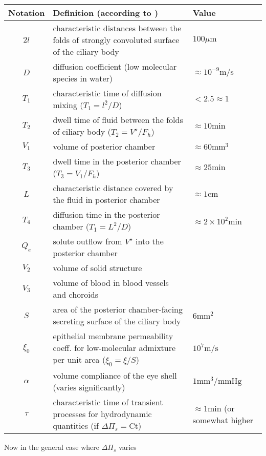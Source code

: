 \documentclass[11pt]{article}
\begin{document}
\begin{center}
\begin{tabular}{|c|p{}|l|}
\hline
Notation & Definition (according to \cite{lyubimov2007dynamics}) & Value \\
\hline
\hline
$2l$& characteristic distances between the folds of strongly convoluted surface of the ciliary body & $100 \mu \mathrm{m}$\\
\hline
$D$ & diffusion coefficient (low molecular species in water) & $\approx 10^{-9} \mathrm{m}/\mathrm{s}$\\
\hline
$T_1$ & characteristic time of diffusion mixing ($T_1 = l^2/D$)& $<2.5 \approx1$\\
\hline
$T_2$ & dwell time of fluid between the folds of ciliary body ($T_2 = V^\star /F_h$) & $\approx 10 \mathrm{min}$\\
\hline
$V_1$ & volume of posterior chamber & $\approx 60 \mathrm{mm}^3$\\
\hline
$T_3$ & dwell time in the posterior chamber ($T_3 = V_1 / F_h$) & $\approx 25 \mathrm{min}$\\
\hline
$L$ & characteristic distance covered by the fluid in posterior chamber & $ \approx 1 \mathrm{cm} $ \\
\hline
$T_4$& diffusion time in the posterior chamber ($T_1 = L^2/D$) & $\approx 2 \times 10^2 \mathrm{min}$
\\ 
\hline
$Q_e$ & solute outflow from $V^\star$ into the posterior chamber & \\
\hline
$V_2$ & volume of solid structure & \\
\hline
$V_3$ & volume of blood in blood vessels and choroids & \\
\hline 
$S$ & area of the posterior chamber-facing secreting surface of the ciliary body & $6 \mathrm{mm}^2 $\\
\hline
$\xi_0$ & epithelial membrane permeability coeff. for low-molecular admixture per unit area ($\xi_0 = \xi/S$) & $ 10^7 \mathrm{
m}/\mathrm{s}$
\\
\hline
$\alpha$ & volume compliance of the eye shell (varies significantly)& $ 1 \mathrm{mm}^3/\mathrm{mmHg}$\\
\hline
$\tau$ & characteristic time of transient processes for hydrodynamic quantities (if $\Delta \Pi_s = \mathrm{Ct}$)&$\approx 1 \mathrm{min}$ (or somewhat higher\\
\hline
\hline
\end{tabular}
\end{center}
Now in the general case where $\Delta \Pi_s$ varies
\end{document}
